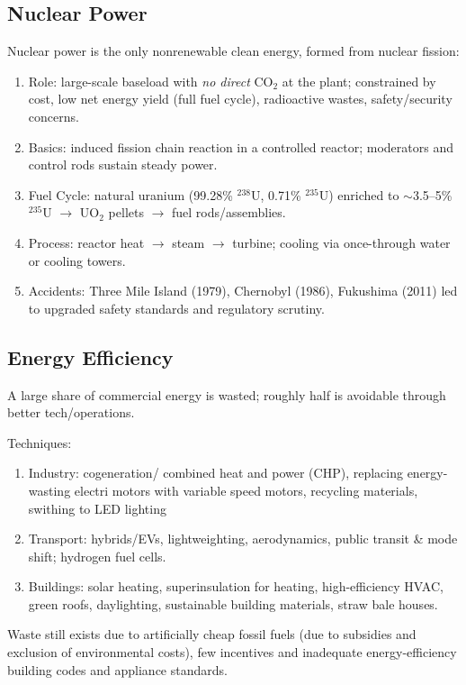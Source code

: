 \documentclass[12pt, a4paper]{article}
\begin{document}
\begin{multicols*}{3}
\subsection{Nuclear Power}
Nuclear power is the only nonrenewable clean energy, formed from nuclear fission:
\begin{enumerate}[\roman*.]
  \item Role: large-scale baseload with \emph{no direct} CO$_2$ at the plant; constrained by cost, low net energy yield (full fuel cycle), radioactive wastes, safety/security concerns.
  \item Basics: induced fission chain reaction in a controlled reactor; moderators and control rods sustain steady power.
  \item Fuel Cycle: natural uranium (99.28\% $^{238}$U, 0.71\% $^{235}$U) enriched to $\sim$3.5--5\% $^{235}$U $\rightarrow$ UO$_2$ pellets $\rightarrow$ fuel rods/assemblies.
  \item Process: reactor heat $\rightarrow$ steam $\rightarrow$ turbine; cooling via once-through water or cooling towers.
  \item Accidents: Three Mile Island (1979), Chernobyl (1986), Fukushima (2011) led to upgraded safety standards and regulatory scrutiny.
\end{enumerate}

\subsection{Energy Efficiency}
A large share of commercial energy is wasted; roughly half is avoidable through better tech/operations.

Techniques:
\begin{enumerate}[\roman*.]
  \item Industry: cogeneration/ combined heat and power (CHP), replacing energy-wasting electri motors with variable speed motors, recycling materials, swithing to LED lighting 
  \item Transport: hybrids/EVs, lightweighting, aerodynamics, public transit \& mode shift; hydrogen fuel cells.
  \item Buildings: solar heating, superinsulation for heating, high-efficiency HVAC, green roofs, daylighting, sustainable building materials, straw bale houses.
\end{enumerate}

Waste still exists due to artificially cheap fossil fuels (due to subsidies and exclusion of environmental costs), few incentives and inadequate energy-efficiency building codes and appliance standards.


\end{multicols*}
\end{document}
